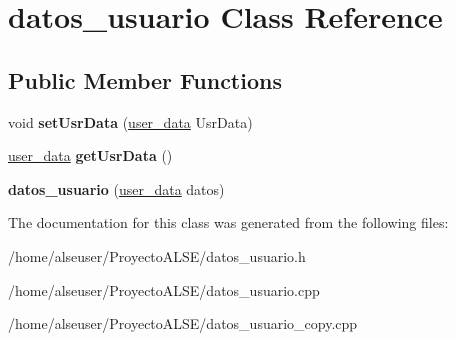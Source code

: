 \hypertarget{classdatos__usuario}{}\section{datos\+\_\+usuario Class Reference}
\label{classdatos__usuario}
\subsection*{Public Member Functions}
\begin{DoxyCompactItemize}
\item 
\mbox{\label{classdatos__usuario_aa63024d7b03ba8bd08748a29b9ee436a}} 
void {\bfseries set\+Usr\+Data} (\hyperlink{structuser__data}{user\+\_\+data} Usr\+Data)
\item 
\mbox{\label{classdatos__usuario_a4c580e077e65cdaa6057e92c15ccec60}} 
\hyperlink{structuser__data}{user\+\_\+data} {\bfseries get\+Usr\+Data} ()
\item 
\mbox{\label{classdatos__usuario_a931103dd6b8abceb0497136df21ca24c}} 
{\bfseries datos\+\_\+usuario} (\hyperlink{structuser__data}{user\+\_\+data} datos)
\end{DoxyCompactItemize}


The documentation for this class was generated from the following files\+:\begin{DoxyCompactItemize}
\item 
/home/alseuser/\+Proyecto\+A\+L\+S\+E/datos\+\_\+usuario.\+h\item 
/home/alseuser/\+Proyecto\+A\+L\+S\+E/datos\+\_\+usuario.\+cpp\item 
/home/alseuser/\+Proyecto\+A\+L\+S\+E/datos\+\_\+usuario\+\_\+copy.\+cpp\end{DoxyCompactItemize}
